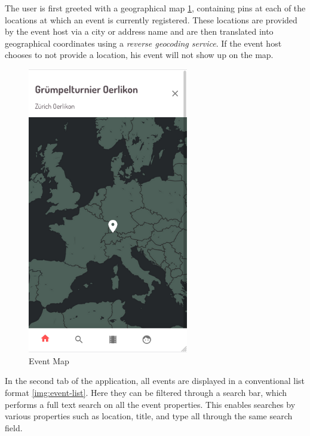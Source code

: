 The user is first greeted with a geographical map \ref{img:event-map}, containing pins at each of the locations at which an event is currently registered. These locations are provided by the event host via a city or address name and are then translated into geographical coordinates using a \textit{reverse geocoding service}. If the event host chooses to not provide a location, his event will not show up on the map. 
\begin{figure}[H]
    \centering
    \includegraphics[width=7cm]{images/map.png}
    \caption{Event Map \protect\footnotemark}
    \label{img:event-map}
\end{figure}
In the second tab of the application, all events are displayed in a conventional list format \ref{img:event-list}. Here they can be filtered through a search bar, which performs a full text search on all the event properties. This enables searches by various properties such as location, title, and type all through the same search field.

